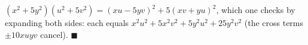 $(x^2+5y^2)(u^2+5v^2)=(xu-5yv)^2+5(xv+yu)^2$, which one checks by expanding both sides: each equals $x^2u^2+5x^2v^2+5y^2u^2+25y^2v^2$ (the cross terms $\pm10xuyv$ cancel). $\blacksquare$

